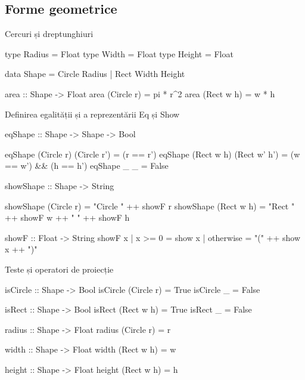 \documentclass[xcolor=pdftex,romanian,colorlinks]{beamer}
\begin{document}
\subsection{Forme geometrice}

\begin{frame}[fragile]{Cercuri și dreptunghiuri}
\begin{asciihs}
  type   Radius   =   Float
  type   Width    =   Float
  type   Height   =   Float

  data   Shape    =   Circle Radius
                  |   Rect Width Height

  area :: Shape -> Float
  area (Circle r) = pi * r^2
  area (Rect w h) = w * h
\end{asciihs}
\end{frame}


\begin{frame}[fragile]{Definirea egalității și a reprezentării}
{Eq și Show}
\begin{asciihs}
  eqShape :: Shape -> Shape -> Bool
\end{asciihs}
\vspace{-2ex}
\begin{asciihs}
  eqShape (Circle r) (Circle r')  = (r == r')
  eqShape (Rect w h) (Rect w' h') = (w == w') && (h == h')
  eqShape _          _            = False

\end{asciihs}
\begin{asciihs}
  showShape :: Shape -> String
\end{asciihs}
\vspace{-2ex}
\begin{asciihs}
  showShape (Circle r) = "Circle " ++ showF r
  showShape (Rect w h) = "Rect " ++ showF w 
      ++ " " ++ showF h

  showF :: Float -> String
  showF x | x >= 0     = show x
          | otherwise = "(" ++ show x ++ ")"
\end{asciihs}
\end{frame}

\begin{frame}[fragile]{Teste și operatori de proiecție}
\begin{asciihs}
  isCircle :: Shape -> Bool
  isCircle (Circle r) = True
  isCircle _          = False

  isRect :: Shape -> Bool
  isRect (Rect w h) = True
  isRect _          = False

  radius :: Shape -> Float
  radius (Circle r) = r

  width :: Shape -> Float
  width (Rect w h) = w

  height :: Shape -> Float
  height (Rect w h) = h
\end{asciihs}
\end{frame}
\end{document}
